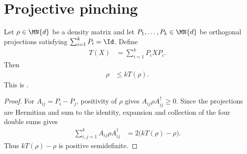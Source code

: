 \section{Projective pinching}

\begin{theorem}
    \label{thm:projective_povm_pinching}
    \leanok
    Let $\rho\in\MN{d}$ be a density matrix and let
    $P_1,\ldots,P_k\in\MN{d}$ be orthogonal projections satisfying
    $\sum_{i=1}^k P_i=\Id$.  Define
    \begin{align}
        T(X) &= \sum_{i=1}^k P_iXP_i .
    \end{align}
    Then
    \begin{align}
        \rho &\le kT(\rho).
        \label{eq:projective_pinching}
    \end{align}
    This is \cite[Chapter~8, Eq.~(8.56)]{Wolf2012Quantum}.
\end{theorem}

\begin{proof}\leanok
    For $A_{ij}=P_i-P_j$, positivity of $\rho$ gives
    $A_{ij}\rho A_{ij}^{\dagger}\ge 0$.  Since the projections are
    Hermitian and sum to the identity, expansion and collection of the four
    double sums gives
    \begin{align}
        \sum_{i,j=1}^k A_{ij}\rho A_{ij}^{\dagger}
        &= 2\bigl(kT(\rho)-\rho\bigr).
    \end{align}
    Thus $kT(\rho)-\rho$ is positive semidefinite.
\end{proof}
